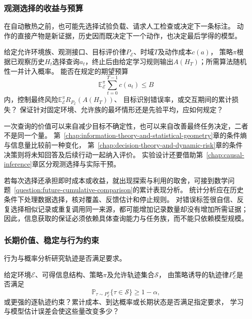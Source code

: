 \subsubsection{观测选择的收益与预算}
\label{sec:future-analysis-information-acquisition}

在自动散热之前，也可能先选择试验负载、请求人工检查或决定下一条标注。
动作的直接产物是新证据，历史因而既决定下一个动作，也决定最后学得的模型。

\begin{mathproblem}[观测选择策略的信息收益与代价]
  \label{question:future-information-acquisition}
  给定允许环境族、观测接口、目标评价律$P_{\mathcal E}$、时域$T$及动作成本$c(a)$，
  策略$\pi$根据已观察历史$H_t$选择查询$a_t$，终止后由给定学习规则输出$A(H_T)$；所需算法随机性一并计入概率。
  能否在规定的期望预算
  \[
    \mathbb E_{\mathcal E}^{\pi}\sum_{t=0}^{T-1}c(a_t)\leq B
  \]
  内，控制最终风险$\mathbb E_{\mathcal E}^{\pi}R_{P_{\mathcal E}}(A(H_T))$、
  目标识别错误率，或交互期间的累计损失？
  保证针对固定环境、允许族的最坏情形还是先验平均，应如何规定？
\end{mathproblem}

一次查询的价值可以来自减少目标不确定性，也可以来自改善最终任务决定，二者不是同一个量。
第~\ref{chap:information-theory-and-statistical-geometry}章的条件熵与信息量比较前一种变化，
第~\ref{chap:decision-theory-and-dynamic-risk}章的条件决策则将未知回答及后续行动一起纳入评价。
实验设计还要借助第~\ref{chap:causal-inference}章区分观测选择与实际干预。

若每次选择还承担即时成本或收益，就出现探索与利用的取舍，可接到数学问题~\ref{question:future-cumulative-comparison}的累计表现分析。
统计分析应在历史条件下处理数据选择，核对覆盖、反馈估计和停止规则。
对错误标签很自信、反复选择相似记录或重复调用同一来源，都可能增加记录数量却没有增加所需证据；
因此，信息获取的保证必须依赖具体查询能力与任务族，而不能只依赖模型规模。

\subsubsection{长期价值、稳定与行为约束}
\label{sec:future-analysis-closed-loop}

行为与概率分析研究轨迹是否满足要求。

\begin{mathproblem}[闭环轨迹能否满足长期要求]
  \label{question:future-closed-loop}
  给定环境$\mathcal E$、可得信息结构、策略$\pi$及允许轨迹集合$\mathcal S$，
  由策略诱导的轨迹律$P_{\mathcal E}^{\pi}$是否满足
  \[
    \mathbb P_{\tau\sim P_{\mathcal E}^{\pi}}\{\tau\in\mathcal S\}
    \geq1-\alpha,
  \]
  或更强的逐轨迹约束？累计成本、到达概率或长期状态是否满足指定要求，
  学习与模型估计误差会使这些量改变多少？
\end{mathproblem}

